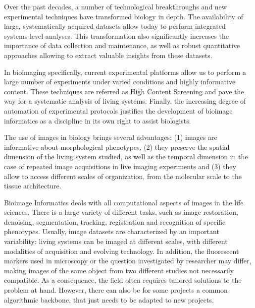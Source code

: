 Over the past decades, a number of technological breakthroughs and new experimental techniques have transformed biology in depth. The availability of large, systematically acquired datasets allow today to perform integrated systems-level analyses. 
This transformation also significantly increases the importance of data collection and maintenance, as well as robust quantitative approaches allowing to extract valuable insights from these datasets.

In bioimaging specifically, current experimental platforms allow us to perform a large number of experiments under varied conditions and highly informative content.
These techniques are referred as High Content Screening and pave the way for a systematic analysis of living systems.
Finally, the increasing degree of automation of experimental protocols justifies the development of bioimage informatics as a discipline in its own right to assist biologists.

The use of images in biology brings several advantages: (1) images are informative about morphological phenotypes, (2)
they preserve the spatial dimension of the living system studied, as well as the temporal dimension in the case of repeated image acquisitions in live imaging experiments and (3) they allow to access different scales of organization, from the molecular scale to the tissue architecture.  

Bioimage Informatics deals with all computational aspects of images in the life sciences. There is a large variety of different tasks, such as image restoration, denoising, segmentation, tracking, registration and recognition of specific phenotypes. Usually, image datasets are characterized by an important variability: 
living systems can be imaged at different scales, with different modalities of acquisition and evolving technology.
In addition, the fluorescent markers used in microscopy or the question investigated by researcher may differ, making images of the same object from two different studies not necessarily compatible.
As a consequence, the field often requires tailored solutions to the problem at hand. However, there can also be for some projects a common algorithmic backbone, that just needs to be adapted to new projects. 

